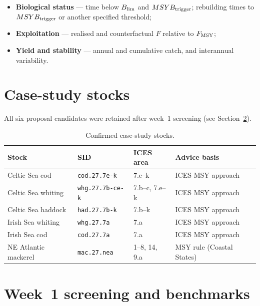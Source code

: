 \documentclass[11pt,a4paper]{extarticle}
\begin{document}
\begin{itemize}
  \item \textbf{Biological status} --- time below \(B_{\lim}\) and \(MSYB_{\mathrm{trigger}}\);
        rebuilding times to \(MSYB_{\mathrm{trigger}}\) or another specified threshold;
  \item \textbf{Exploitation} --- realised and counterfactual \(F\) relative
        to \(F_{\mathrm{MSY}}\);
  \item \textbf{Yield and stability} --- annual and cumulative catch, and
        interannual variability.
\end{itemize}

\section{Case-study stocks}
\label{sec:casestudies}


All six proposal candidates were retained after week~1 screening
(see Section~\ref{sec:screening}).

\begin{table}[H]
\centering
\caption{Confirmed case-study stocks.}
\label{tab:stocks}
\begin{tabular}{@{}llll@{}}
\toprule
Stock & SID & ICES area & Advice basis \\
\midrule
Celtic Sea cod & \texttt{cod.27.7e-k} & 7.e--k & ICES MSY approach \\
Celtic Sea whiting & \texttt{whg.27.7b-ce-k} & 7.b--c, 7.e--k & ICES MSY approach \\
Celtic Sea haddock & \texttt{had.27.7b-k} & 7.b--k & ICES MSY approach \\
Irish Sea whiting & \texttt{whg.27.7a} & 7.a & ICES MSY approach \\
Irish Sea cod & \texttt{cod.27.7a} & 7.a & ICES MSY approach \\
NE Atlantic mackerel & \texttt{mac.27.nea} & 1--8, 14, 9.a & MSY rule (Coastal States) \\
\bottomrule
\end{tabular}
\end{table}

\section{Week~1 screening and benchmarks}
\label{sec:screening}
\end{document}
